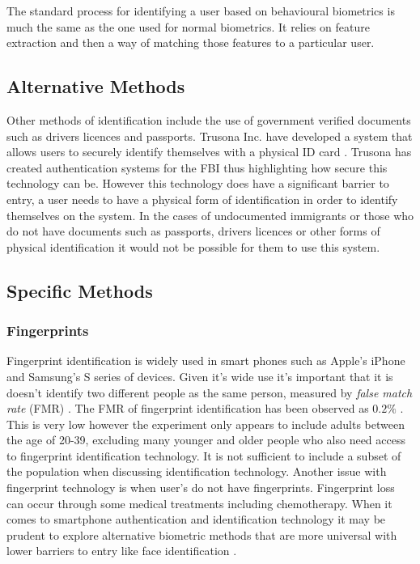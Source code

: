 \documentclass[12pt]{article}
\begin{document}
	The standard process for identifying a user based on behavioural biometrics is much the same as the one used for normal biometrics. It relies on feature extraction and then a way of matching those features to a particular user.
	
	
	\subsection{Alternative Methods}
	Other methods of identification include the use of government verified documents such as drivers licences and passports.
	Trusona Inc. have developed a system that allows users to securely identify themselves with a physical ID card \citep{eisen2017systems}. Trusona has created authentication systems for the FBI \citep{abagnale_2017} thus highlighting how secure this technology can be. However this technology does have a significant barrier to entry, a user needs to have a physical form of identification in order to identify themselves on the system. In the cases of undocumented immigrants or those who do not have documents such as passports, drivers licences or other forms of physical identification it would not be possible for them to use this system.
	
	\subsection{Specific Methods}
	\label{subsect:specific_methods}
	\subsubsection{Fingerprints}
	\label{subsubsect:fingerprints}
	Fingerprint identification is widely used in smart phones such as Apple's iPhone and Samsung's S series of devices. Given it's wide use it's important that it is doesn't identify two different people as the same person, measured by \emph{false match rate} (FMR) \citep{delac2004survey}. The FMR of fingerprint identification has been observed as $0.2\%$ \citep{delac2004survey}. This is very low however the experiment only appears to include adults between the age of 20-39, excluding many younger and older people who also need access to fingerprint identification technology. It is not sufficient to include a subset of the population when discussing identification technology. Another issue with fingerprint technology is when user's do not have fingerprints. Fingerprint loss can occur through some medical treatments including chemotherapy. When it comes to smartphone authentication and identification technology it may be prudent to explore alternative biometric methods that are more universal with lower barriers to entry like face identification \citep{prabhakar2003biometric}.
	\\
	\\
\end{document}
